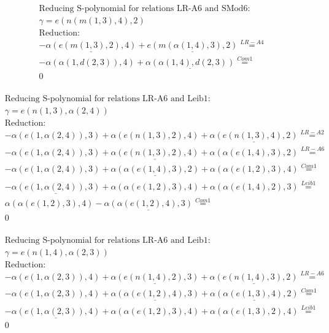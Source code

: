 \documentclass[11pt]{amsart}
\begin{document}
\begin{align*} 
& \text{Reducing S-polynomial for relations LR-A6 and SMod6:} \\ 
& \gamma = e(n(m(1,3),4),2) \\ 
& \text{Reduction}: \\& - \underline{\alpha(e(m(1,3),2),4)} + \underline{e(m(\alpha(1,4),3),2)} \stackrel{ LR-A4 }{=}  \\ 
& - \alpha(\alpha(1,d(2,3)),4) + \underline{\alpha(\alpha(1,4),d(2,3))} \stackrel{ Com1 }{=}  \\ 
&0\\ 
\end{align*} 
 
\begin{align*} 
& \text{Reducing S-polynomial for relations LR-A6 and Leib1:} \\ 
& \gamma = e(n(1,3),\alpha(2,4)) \\ 
& \text{Reduction}: \\& - \alpha(e(1,\alpha(2,4)),3) + \alpha(e(n(1,3),2),4) + \underline{\alpha(e(n(1,3),4),2)} \stackrel{ LR-A2 }{=}  \\ 
& - \alpha(e(1,\alpha(2,4)),3) + \underline{\alpha(e(n(1,3),2),4)} + \alpha(\alpha(e(1,4),3),2) \stackrel{ LR-A6 }{=}  \\ 
& - \alpha(e(1,\alpha(2,4)),3) + \underline{\alpha(\alpha(e(1,4),3),2)} + \alpha(\alpha(e(1,2),3),4) \stackrel{ Com1 }{=}  \\ 
& - \underline{\alpha(e(1,\alpha(2,4)),3)} + \alpha(\alpha(e(1,2),3),4) + \alpha(\alpha(e(1,4),2),3) \stackrel{ Leib1 }{=}  \\ 
&\alpha(\alpha(e(1,2),3),4) - \underline{\alpha(\alpha(e(1,2),4),3)} \stackrel{ Com1 }{=}  \\ 
&0\\ 
\end{align*} 
 
\begin{align*} 
& \text{Reducing S-polynomial for relations LR-A6 and Leib1:} \\ 
& \gamma = e(n(1,4),\alpha(2,3)) \\ 
& \text{Reduction}: \\& - \alpha(e(1,\alpha(2,3)),4) + \underline{\alpha(e(n(1,4),2),3)} + \underline{\alpha(e(n(1,4),3),2)} \stackrel{ LR-A6 }{=}  \\ 
& - \alpha(e(1,\alpha(2,3)),4) + \underline{\alpha(\alpha(e(1,2),4),3)} + \underline{\alpha(\alpha(e(1,3),4),2)} \stackrel{ Com1 }{=}  \\ 
& - \underline{\alpha(e(1,\alpha(2,3)),4)} + \alpha(\alpha(e(1,2),3),4) + \alpha(\alpha(e(1,3),2),4) \stackrel{ Leib1 }{=}  \\ 
&0\\ 
\end{align*} 
 
\end{document}
